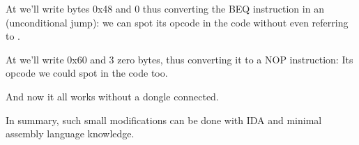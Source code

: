 At  we'll write bytes 0x48 and 0 thus converting the \ac{BEQ} instruction in an  (unconditional jump):
we can spot its opcode in the code without even referring to \PPC.

At  we'll write 0x60 and 3 zero bytes, thus converting it to a
\ac{NOP} instruction:
Its opcode we could spot in the code too.

And now it all works without a dongle connected.

In summary, such small modifications can be done with \ac{IDA} and minimal assembly language knowledge.

